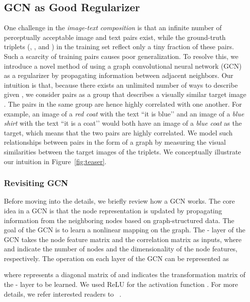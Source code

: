 \documentclass[10pt,twocolumn,letterpaper]{article}
\begin{document}
\subsection{GCN as Good Regularizer}

One challenge in the \textit{image-text composition} is that an infinite number of perceptually acceptable image and text pairs exist, while the ground-truth triplets (, , and ) in the training set reflect only a tiny fraction of these pairs. Such a scarcity of training pairs causes poor generalization. To resolve this, we introduce a novel method of using a graph convolutional neural network (GCN) as a regularizer by propagating information between adjacent neighbors. Our intuition is that, because there exists an unlimited number of ways to describe  given , we consider  pairs as a group that describes a visually similar target image . The  pairs in the same group are hence highly correlated with one another. For example,  an image of a \textit{red coat} with the text ``it is blue’’ and an image of a \textit{blue shirt} with the text ``it is a coat’’ would both have an image of a \textit{blue coat} as the target, which means that the two pairs are highly correlated. We model such relationships between pairs in the form of a graph by measuring the visual similarities between the target images of the triplets. We conceptually illustrate our intuition in Figure~\ref{fig:teaser}.

\subsubsection{Revisiting GCN}
Before moving into the details, we briefly review how a GCN works. The core idea in a GCN is that the node representation is updated by propagating information from the neighboring nodes based on graph-structured data. The goal of the GCN is to learn a nonlinear mapping  on the graph. The - layer of the GCN takes the node feature matrix  and the correlation matrix  as inputs, where  and  indicate the number of nodes and the dimensionality of the node features, respectively. The operation on each layer of the GCN can be represented as

where  represents a diagonal matrix of  and  indicates the transformation matrix of the - layer to be learned. We used ReLU for the activation function . For more details, we refer interested readers to ~\cite{kipf2016semi}.
\end{document}
